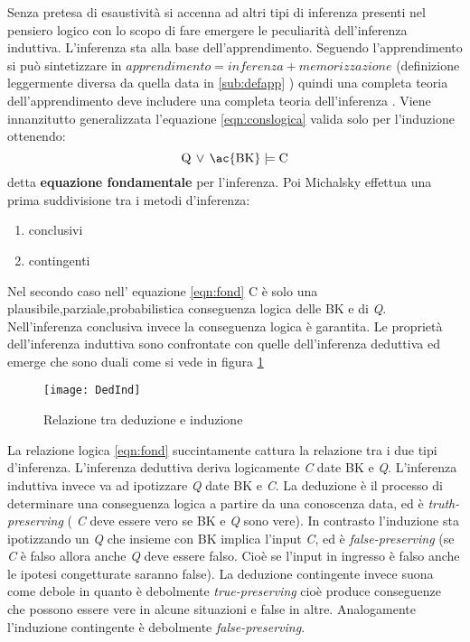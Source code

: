Senza pretesa di esaustività si accenna ad altri tipi di inferenza presenti nel pensiero logico con lo scopo di fare emergere le peculiarità dell'inferenza induttiva. L'inferenza sta alla base dell'apprendimento. Seguendo \cite{Mic93} l'apprendimento si può sintetizzare in $apprendimento=inferenza+memorizzazione$ (definizione leggermente diversa da quella data in \ref{sub:defapp} ) quindi una completa teoria dell'apprendimento deve includere una completa teoria dell'inferenza  \cite{Mic93}. Viene innanzitutto generalizzata l'equazione \eqref{eqn:conslogica} valida solo per l'induzione  ottenendo:
\begin{equation}
\label{eqn:fond}
\text{Q} \,  \lor \,  \text{\ac{BK}} \models \text{C}
\end{equation}
detta \textbf{equazione fondamentale} per l'inferenza.
Poi Michalsky effettua una prima suddivisione tra i metodi d'inferenza:
\begin{enumerate}
\item conclusivi
\item contingenti
\end{enumerate} 
 Nel secondo caso nell' equazione \eqref{eqn:fond} C è solo una plausibile,parziale,probabilistica conseguenza logica delle \ac{BK} e di \textit{Q}. Nell'inferenza conclusiva invece la conseguenza logica è garantita.
Le proprietà dell'inferenza induttiva  sono confrontate  con quelle dell'inferenza deduttiva ed emerge che sono duali come si vede in figura \ref{fig:dedind}
\begin{figure}[htp]
	\centering
	\texttt{[image: DedInd]}
	\caption[Relazione tra deduzione e induzione]{Relazione tra deduzione e induzione}
   \label{fig:dedind}
\end{figure} 
La relazione logica \eqref{eqn:fond} succintamente cattura la relazione tra i due tipi d'inferenza. L'inferenza deduttiva deriva logicamente \textit{C} date \ac{BK} e \textit{Q}. L'inferenza induttiva invece va ad ipotizzare \textit{Q} date \ac{BK} e \textit{C}. La deduzione è il processo di determinare una conseguenza logica a partire da una conoscenza data, ed è \emph{truth-preserving} ( \textit{C} deve essere vero se \ac{BK} e \textit{Q} sono vere). In contrasto l'induzione sta ipotizzando un \textit{Q} che insieme con \ac{BK} implica l'input \textit{C}, ed è \emph{false-preserving} (se \textit{C} è falso  allora anche \textit{Q} deve essere falso. Cioè se  l'input in ingresso è falso anche le ipotesi congetturate saranno false). La deduzione contingente invece suona come debole in quanto è debolmente \textit{true-preserving} cioè produce conseguenze che possono essere vere in alcune situazioni e false in altre. Analogamente l'induzione contingente è debolmente \textit{false-preserving}.

